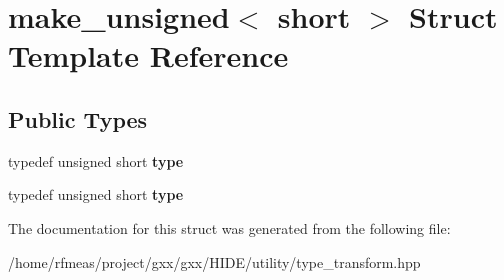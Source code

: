 \hypertarget{structmake__unsigned_3_01short_01_4}{}\section{make\+\_\+unsigned$<$ short $>$ Struct Template Reference}
\label{structmake__unsigned_3_01short_01_4}
\subsection*{Public Types}
\begin{DoxyCompactItemize}
\item 
typedef unsigned short {\bfseries type}\hypertarget{structmake__unsigned_3_01short_01_4_a8d7ee526d3b1795daceb2f308de78fcd}{}\label{structmake__unsigned_3_01short_01_4_a8d7ee526d3b1795daceb2f308de78fcd}

\item 
typedef unsigned short {\bfseries type}\hypertarget{structmake__unsigned_3_01short_01_4_a8d7ee526d3b1795daceb2f308de78fcd}{}\label{structmake__unsigned_3_01short_01_4_a8d7ee526d3b1795daceb2f308de78fcd}

\end{DoxyCompactItemize}


The documentation for this struct was generated from the following file\+:\begin{DoxyCompactItemize}
\item 
/home/rfmeas/project/gxx/gxx/\+H\+I\+D\+E/utility/type\+\_\+transform.\+hpp\end{DoxyCompactItemize}
